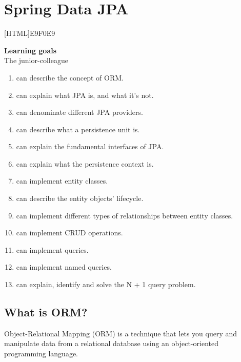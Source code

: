 \chapter{Spring Data JPA}

[HTML]{E9F0E9}{\parbox{\textwidth}{%
\noindent \textbf{Learning goals}\\
The junior-colleague
\begin{enumerate}[nolistsep]
\item can describe the concept of ORM.
\item can explain what JPA is, and what it’s not.
\item can denominate different JPA providers.
\item can describe what a persistence unit is.
\item can explain the fundamental interfaces of JPA.
\item can explain what the persistence context is.
\item can implement entity classes.
\item can describe the entity objects’ lifecycle.
\item can implement different types of relationships between entity classes.
\item can implement CRUD operations.
\item can implement queries.
\item can implement named queries.
\item can explain, identify and solve the N + 1 query problem.
\end{enumerate}}}

  
\section{What is ORM?}

Object-Relational Mapping (ORM) is a technique that lets you query and manipulate data from a relational database using an object-oriented programming language.

